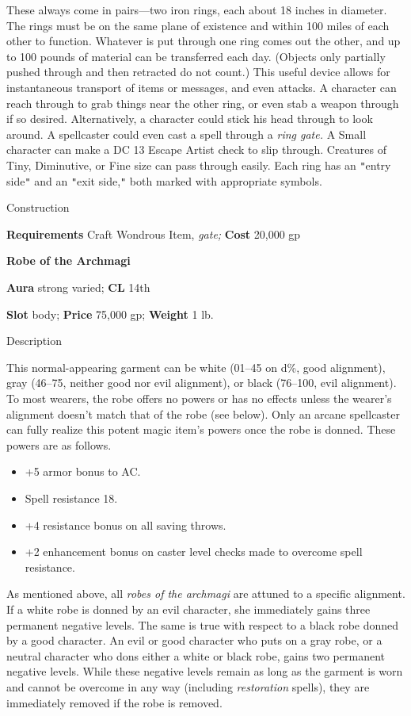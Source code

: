 These always come in pairs---two iron rings, each about 18 inches in diameter. The rings must be on the same plane of existence and within 100 miles of each other to function. Whatever is put through one ring comes out the other, and up to 100 pounds of material can be transferred each day. (Objects only partially pushed through and then retracted do not count.) This useful device allows for instantaneous transport of items or messages, and even attacks. A character can reach through to grab things near the other ring, or even stab a weapon through if so desired. Alternatively, a character could stick his head through to look around. A spellcaster could even cast a spell through a \textit{ring gate.} A Small character can make a DC 13 Escape Artist check to slip through. Creatures of Tiny, Diminutive, or Fine size can pass through easily. Each ring has an \texttt{{}"{}}entry side\texttt{{}"{}} and an \texttt{{}"{}}exit side,\texttt{{}"{}} both marked with appropriate symbols. 
				
Construction
				
\textbf{Requirements} Craft Wondrous Item,\textit{ gate;}\textbf{ Cost }20,000 gp
				
\textbf{Robe of the Archmagi}
				
\textbf{Aura} strong varied;\textbf{ CL }14th
				
\textbf{Slot} body; \textbf{Price} 75,000 gp; \textbf{Weight} 1 lb.
				
Description
				
This normal-appearing garment can be white (01--45 on d\%, good alignment), gray (46--75, neither good nor evil alignment), or black (76--100, evil alignment). To most wearers, the robe offers no powers or has no effects unless the wearer's alignment doesn't match that of the robe (see below). Only an arcane spellcaster can fully realize this potent magic item's powers once the robe is donned. These powers are as follows.
				\begin{itemize}\item  +5 armor bonus to AC.
				\item  Spell resistance 18.
				\item  +4 resistance bonus on all saving throws.
				\item  +2 enhancement bonus on caster level checks made to overcome spell resistance.
\end{itemize}
				
As mentioned above, all \textit{robes of the archmagi} are attuned to a specific alignment. If a white robe is donned by an evil character, she immediately gains three permanent negative levels. The same is true with respect to a black robe donned by a good character. An evil or good character who puts on a gray robe, or a neutral character who dons either a white or black robe, gains two permanent negative levels. While these negative levels remain as long as the garment is worn and cannot be overcome in any way (including \textit{restoration} spells), they are immediately removed if the robe is removed. 
				
